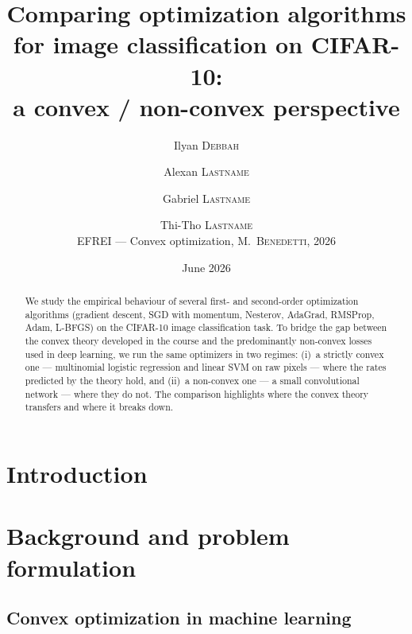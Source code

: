 \documentclass[11pt,a4paper]{article}
\title{Comparing optimization algorithms for image classification on CIFAR-10:\\
       a convex / non-convex perspective}
\author{Ilyan \textsc{Debbah} \and Alexan \textsc{Lastname} \and Gabriel \textsc{Lastname} \and Thi-Tho \textsc{Lastname}\\
        \small EFREI — Convex optimization, M.~B\textsc{enedetti}, 2026}
\date{June 2026}
\begin{document}
\maketitle

\begin{abstract}
We study the empirical behaviour of several first- and second-order optimization
algorithms (gradient descent, SGD with momentum, Nesterov, AdaGrad, RMSProp,
Adam, L-BFGS) on the CIFAR-10 image classification task. To bridge the gap
between the convex theory developed in the course and the predominantly
non-convex losses used in deep learning, we run the same optimizers in two
regimes: (i)~a strictly convex one --- multinomial logistic regression and
linear SVM on raw pixels --- where the rates predicted by the theory hold, and
(ii)~a non-convex one --- a small convolutional network --- where they do not.
The comparison highlights where the convex theory transfers and where it
breaks down.
\end{abstract}

\tableofcontents

\section{Introduction}

\section{Background and problem formulation}

\subsection{Convex optimization in machine learning}
\end{document}
